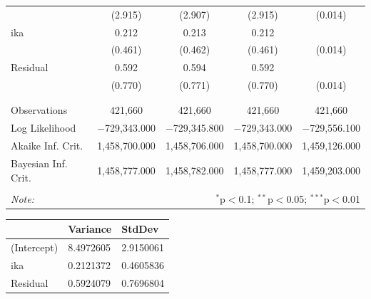 \documentclass[finnish]{docopts}
\begin{document}
\begin{table}[!htbp]
\begin{tabular}{@{\extracolsep{5pt}}lcccc}
  & (2.915) & (2.907) & (2.915) & (0.014) \\ 
ika & 0.212 & 0.213 & 0.212 &\\
  & (0.461) & (0.462) & (0.461) & (0.014) \\ 
Residual & 0.592 & 0.594 & 0.592 &\\
  & (0.770) & (0.771) & (0.770) & (0.014) \\ 
  & & & & \\ 
\hline \\[-1.8ex] 
Observations & 421,660 & 421,660 & 421,660 & 421,660 \\ 
Log Likelihood & $-$729,343.000 & $-$729,345.800 & $-$729,343.000 & $-$729,556.100 \\ 
Akaike Inf. Crit. & 1,458,700.000 & 1,458,706.000 & 1,458,700.000 & 1,459,126.000 \\ 
Bayesian Inf. Crit. & 1,458,777.000 & 1,458,782.000 & 1,458,777.000 & 1,459,203.000 \\ 
\hline 
\hline \\[-1.8ex] 
\textit{Note:}  & \multicolumn{4}{r}{$^{*}$p$<$0.1; $^{**}$p$<$0.05; $^{***}$p$<$0.01} \\ 
\end{tabular} 
\end{table} 

\begin{table}[H]
\centering
\begin{tabular}{lll}
\toprule
  & Variance & StdDev\\
\midrule
(Intercept) & 8.4972605 & 2.9150061\\
ika & 0.2121372 & 0.4605836\\
Residual & 0.5924079 & 0.7696804\\
\bottomrule
\end{tabular}
\end{table}
\end{document}
